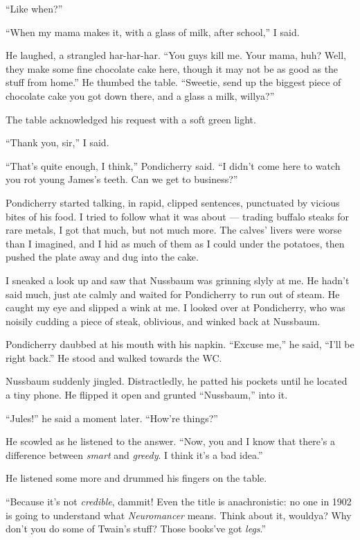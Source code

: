 ``Like when?''

``When my mama makes it, with a glass of milk, after school,'' I
said.

He laughed, a strangled har-har-har.
``You guys kill me. Your mama, huh? Well, they make some fine chocolate cake 
here, though it may not be as good as the stuff from home.''
He thumbed the table.
``Sweetie, send up the biggest piece of chocolate cake you got down there, and 
a glass a milk, willya?''

The table acknowledged his request with a soft green light.

``Thank you, sir,'' I said.

``That's quite enough, I think,'' Pondicherry said.
``I didn't come here to watch you rot young James's teeth. Can we get to 
business?''

Pondicherry started talking, in rapid, clipped sentences,
punctuated by vicious bites of his food. I tried to follow what it
was about --- trading buffalo steaks for rare metals, I got that
much, but not much more. The calves' livers were worse than I
imagined, and I hid as much of them as I could under the potatoes,
then pushed the plate away and dug into the cake.

I sneaked a look up and saw that Nussbaum was grinning slyly at me.
He hadn't said much, just ate calmly and waited for Pondicherry to
run out of steam. He caught my eye and slipped a wink at me. I
looked over at Pondicherry, who was noisily cudding a piece of
steak, oblivious, and winked back at Nussbaum.

Pondicherry daubbed at his mouth with his napkin. ``Excuse me,'' he
said, ``I'll be right back.'' He stood and walked towards the WC.

Nussbaum suddenly jingled. Distractledly, he patted his pockets
until he located a tiny phone. He flipped it open and grunted
``Nussbaum,'' into it.

``Jules!'' he said a moment later. ``How're things?''

He scowled as he listened to the answer.
``Now, you and I know that there's a difference between \emph{smart} and 
\emph{greedy}. I think it's a bad idea.''

He listened some more and drummed his fingers on the table.

``Because it's not \emph{credible}, dammit! Even the title is anachronistic: no 
one in 1902 is going to understand what \emph{Neuromancer} means. Think about 
it, wouldya? Why don't you do some of Twain's stuff? Those books've got 
\emph{legs}.''

